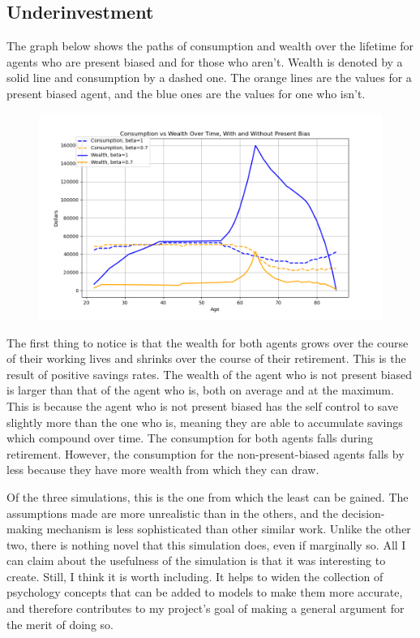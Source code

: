 \documentclass[10pt,twocolumn]{article}
\begin{document}
\subsection{Underinvestment}
The graph below shows the paths of consumption and wealth over the lifetime for agents who are present biased and for those who aren't. Wealth is denoted by a solid line and consumption by a dashed one. The orange lines are the values for a present biased agent, and the blue ones are the values for one who isn't. 
\begin{figure}[H]
    \centering
    \includegraphics[width=0.8\linewidth]{images/underinvestment4.png}
    \label{fig:enter-label}
\end{figure}
The first thing to notice is that the wealth for both agents grows over the course of their working lives and shrinks over the course of their retirement. This is the result of positive savings rates. The wealth of the agent who is not present biased is larger than that of the agent who is, both on average and at the maximum. This is because the agent who is not present biased has the self control to save slightly more than the one who is, meaning they are able to accumulate savings which compound over time. The consumption for both agents falls during retirement. However, the consumption for the non-present-biased agents falls by less because they have more wealth from which they can draw.

Of the three simulations, this is the one from which the least can be gained. The assumptions made are more unrealistic than in the others, and the decision-making mechanism is less sophisticated than other similar work. Unlike the other two, there is nothing novel that this simulation does, even if marginally so. All I can claim about the usefulness of the simulation is that it was interesting to create. Still, I think it is worth including. It helps to widen the collection of psychology concepts that can be added to models to make them more accurate, and therefore contributes to my project's goal of making a general argument for the merit of doing so. 
\end{document}
